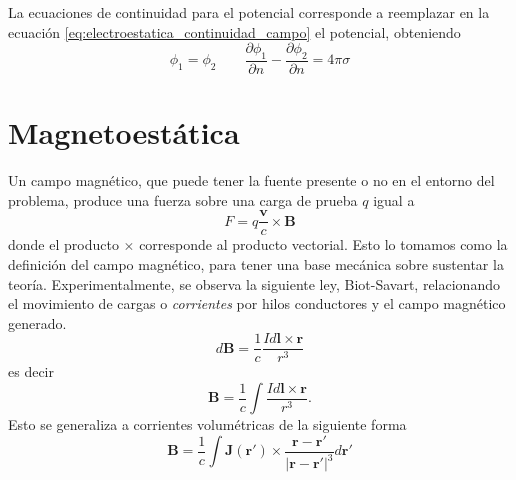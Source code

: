 \documentclass[a4paper]{article}
\numberwithin{equation}{section} %
\renewcommand{\vec}[1]{\boldsymbol{#1}}
\newcommand{\Rinv}{\frac{\vec{r} - \vec{r}'}{|\vec{r} - \vec{r}'|^3}}
\begin{document}
 La ecuaciones de continuidad para el potencial corresponde a reemplazar en la ecuación \ref{eq:electroestatica_continuidad_campo} el potencial, obteniendo
 \begin{equation}
  \phi_1 = \phi_2 \qquad \frac{\partial \phi_1}{\partial n} - \frac{\partial \phi_2}{\partial n} = 4 \pi \sigma
 \end{equation}
 
\section{Magnetoestática}
Un campo magnético, que puede tener la fuente presente o no en el entorno del problema, produce una fuerza sobre una carga de prueba $q$ igual a
\begin{equation}
F = q \frac{\vec{v}}{c} \times \vec{B}
\end{equation}
donde el producto $\times$ corresponde al producto vectorial. Esto lo tomamos como la definición del campo magnético, para tener una base mecánica sobre sustentar la teoría.
Experimentalmente, se observa la siguiente ley, Biot-Savart, relacionando el movimiento de cargas o \emph{corrientes} por hilos conductores y el campo magnético generado.
\begin{equation}
 d\vec{B} = \frac{1}{c} \frac{I d\vec{l} \times \vec{r}}{r^3}
\end{equation}
es decir
\begin{equation}
    \vec{B} = \frac{1}{c} \int  \frac{I d\vec{l} \times \vec{r}}{r^3}.
\end{equation}
Esto se generaliza a corrientes volumétricas de la siguiente forma
\begin{equation}
    \vec{B} = \frac{1}{c} \int  \vec{J}(\vec{r}') \times \Rinv d\vec{r}'
    \label{eq:biot_savart}
\end{equation}
\end{document}
